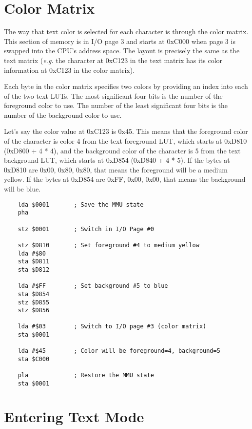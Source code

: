 \section*{Color Matrix}

The way that text color is selected for each character is through the color matrix. This section of memory is in I/O page 3 and starts at 0xC000 when page 3 is swapped into the CPU's address space. The layout is precisely the same as the text matrix ({\it e.g.} the character at 0xC123 in the text matrix has its color information at 0xC123 in the color matrix).

Each byte in the color matrix specifies two colors by providing an index into each of the two text LUTs. The most significant four bits is the number of the foreground color to use. The number of the least significant four bits is the number of the background color to use.

Let's say the color value at 0xC123 is 0x45. This means that the foreground color of the character is color 4 from the text foreground LUT, which starts at 0xD810 (0xD800 + 4 * 4), and the background color of the character is 5 from the text background LUT, which starts at 0xD854 (0xD840 + 4 * 5). If the bytes at 0xD810 are 0x00, 0x80, 0x80, that means the foreground will be a medium yellow. If the bytes at 0xD854 are 0xFF, 0x00, 0x00, that means the background will be blue.

\begin{verbatim}
    lda $0001       ; Save the MMU state
    pha

    stz $0001       ; Switch in I/O Page #0

    stz $D810       ; Set foreground #4 to medium yellow
    lda #$80
    sta $D811
    sta $D812

    lda #$FF        ; Set background #5 to blue
    sta $D854
    stz $D855
    stz $D856

    lda #$03        ; Switch to I/O page #3 (color matrix)
    sta $0001

    lda #$45        ; Color will be foreground=4, background=5
    sta $C000

    pla             ; Restore the MMU state
    sta $0001
\end{verbatim}

\section*{Entering Text Mode}

